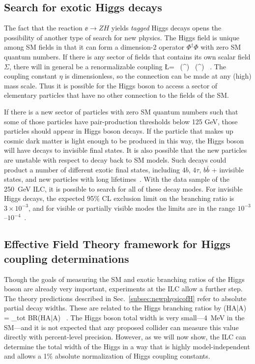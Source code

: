 \subsection{Search for exotic Higgs decays}

The fact that the reaction $\ee\to ZH$ yields {\it tagged} Higgs decays opens the 
possibility of another type of search for new physics.
The Higgs field is unique among SM fields in that it can form a dimension-2 operator 
$\Phi^\dagger \Phi$ with zero SM quantum numbers.  If there is any sector of fields that contains its own scalar field $\Sigma$, there will in general be a renormalizable coupling 
\beq
          \Delta \L   =   \eta\    (\Phi^\dagger \Phi) \, (\Sigma^\dagger \Sigma)  \ .
The coupling constant $\eta$ is dimensionless, so the connection can be made at any (high) mass scale.   Thus it is possible for the Higgs boson to access a sector of elementary particles that have no other connection to the fields of the SM. 

If there is a new sector of particles with zero SM quantum numbers such that some of those particles have pair-production thresholds below 125 GeV, those particles should appear in Higgs boson decays.   If the particle that makes up cosmic dark matter is light enough to be produced in this way, the Higgs boson will have decays to invisible final states.   It is also possible that the new particles are unstable with respect to decay back to SM models.   Such decays could product  a number of different exotic
final states, including $4b$,
$4\tau$, $b\bar b$ + invisible states, and new particles with long lifetimes~\cite{Curtin:2013fra}.   With the data sample of the 250~GeV ILC, it is possible to search for all of these decay modes.   For  invisible Higgs decays, the expected 95\% CL exclusion limit on the  branching ratio is  $3\times 10^{-3}$, 
and for 
visible or partially visible modes the limits are in the range $10^{-3}$--$10^{-4}$~\cite{Liu:2016zki}. 

\subsection{Effective Field Theory framework for Higgs coupling determinations}
\label{subsec:phys_eft}

Though the goals of measuring the SM and exotic branching ratios of the Higgs boson are already very important, experiments at the ILC allow a further step.   The theory predictions described in Sec.~\ref{subsec:newphysicofH} refer to absolute partial decay widths.   These are 
related to the Higgs branching ratios by 
\beq
           \Gamma(H\to A\bar A) =   \Gamma_{tot} \cdot BR(H\to A\bar A)  \  .
\eeqn
The Higgs boson total width is very small---4~MeV in the SM---and it is not expected that any proposed collider can measure this value directly  with percent-level precision.
However, as we will now show, the ILC can determine the total width of the Higgs in a 
way that is highly model-independent and allows a 1\% absolute normalization of Higgs coupling constants.

